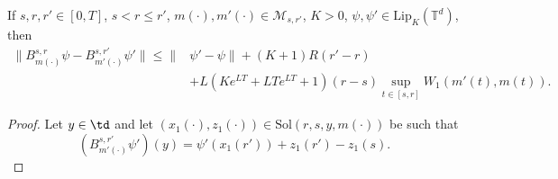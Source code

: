 \documentclass[a4paper,12pt]{article}
\begin{document}
\begin{lemma}\label{lm:B_continuity}
	If $s,r,r'\in [0,T]$, $s<r\leq r'$, $m(\cdot),m'(\cdot)\in\mathcal{M}_{s,r'}$, $K>0$, $\psi,\psi'\in \mathrm{Lip}_{K}(\mathbb{T}^d)$, then 
	\begin{equation*}
	\begin{split}
	\|B^{s,r}_{m(\cdot)}\psi-B^{s,r'}_{m'(\cdot)}\psi'\|\leq \|&\psi'-\psi\|+ (K+1)R(r'-r)\\&+L(Ke^{LT}+LTe^{LT}+1)(r-s)\sup_{t\in [s,r]}W_1(m'(t),m(t)).\end{split}\end{equation*}
\end{lemma}
\begin{proof}
	Let $y\in\td$ and let $(x_1(\cdot),z_1(\cdot))\in \mathrm{Sol}(r,s,y,m(\cdot))$ be such that
	$$(B^{s,r'}_{m'(\cdot)}\psi')(y)=\psi'(x_1(r'))+z_1(r')-z_1(s). $$
	

\end{proof}
\end{document}
